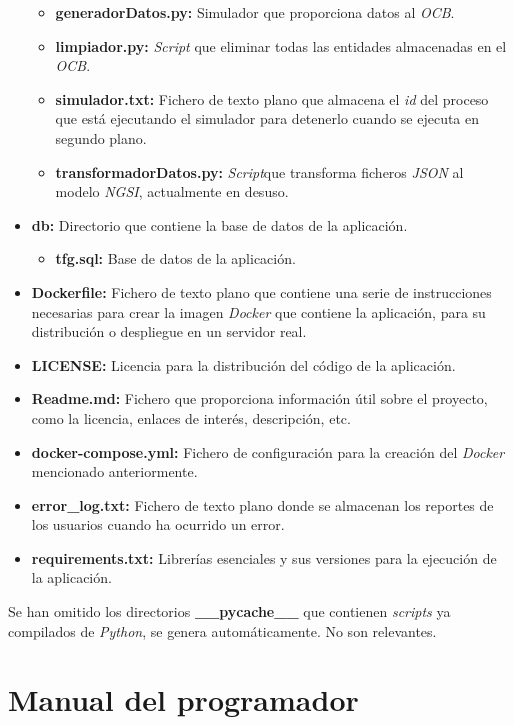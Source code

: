\begin{itemize}
\begin{itemize}
        \item \textbf{generadorDatos.py:} Simulador que proporciona datos al \textit{OCB}.
        \item \textbf{limpiador.py:} \textit{Script} que eliminar todas las entidades almacenadas en el \textit{OCB}.
        \item \textbf{simulador.txt:} Fichero de texto plano que almacena el \textit{id} del proceso que está ejecutando el simulador para detenerlo cuando se ejecuta en segundo plano.
        \item \textbf{transformadorDatos.py:} \textit{Script}que transforma ficheros \textit{JSON} al modelo \textit{NGSI}, actualmente en desuso.
    \end{itemize}
    \item \textbf{db:} Directorio que contiene la base de datos de la aplicación.
    \begin{itemize}
        \item \textbf{tfg.sql:} Base de datos de la aplicación.
    \end{itemize}
    \item \textbf{Dockerfile:} Fichero de texto plano que contiene una serie de instrucciones necesarias para crear la imagen \textit{Docker} que contiene la aplicación, para su distribución o despliegue en un servidor real.
    \item \textbf{LICENSE:} Licencia para la  distribución del código de la aplicación.
    \item \textbf{Readme.md:} Fichero que proporciona información útil sobre el proyecto, como la licencia, enlaces de interés, descripción, etc.
    \item \textbf{docker-compose.yml:} Fichero de configuración para la creación del \textit{Docker} mencionado anteriormente.
    \item \textbf{error\_log.txt:} Fichero de texto plano donde se almacenan los reportes de los usuarios cuando ha ocurrido un error.
    \item \textbf{requirements.txt:} Librerías esenciales y sus versiones para la ejecución de la aplicación.
\end{itemize}

Se han omitido los directorios \textbf{\_\_pycache\_\_} que contienen \textit{scripts} ya compilados de \textit{Python}, se genera automáticamente. No son relevantes.


\section{Manual del programador}

